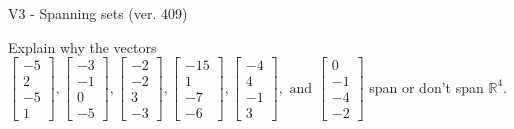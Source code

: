 \begin{exercise}
  \begin{exerciseTitle}V3 - Spanning sets (ver. 409)\end{exerciseTitle}
  \begin{exerciseStatement}
    Explain why the vectors \(\left[\begin{array}{r}
-5 \\
2 \\
-5 \\
1
\end{array}\right] , \left[\begin{array}{r}
-3 \\
-1 \\
0 \\
-5
\end{array}\right] , \left[\begin{array}{r}
-2 \\
-2 \\
3 \\
-3
\end{array}\right] , \left[\begin{array}{r}
-15 \\
1 \\
-7 \\
-6
\end{array}\right] , \left[\begin{array}{r}
-4 \\
4 \\
-1 \\
3
\end{array}\right] , \text{ and } \left[\begin{array}{r}
0 \\
-1 \\
-4 \\
-2
\end{array}\right]\) span or don't span \(\mathbb{R}^4\). 
	



\end{exerciseStatement}
\end{exercise}
